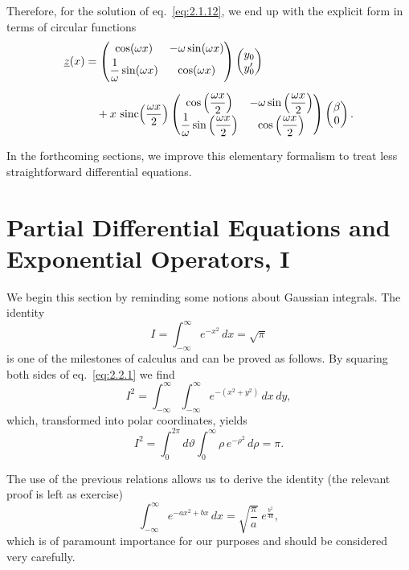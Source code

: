 Therefore, for the solution of eq.~\eqref{eq:2.1.12}, we end up with the explicit form in terms of circular functions
\begin{align}
\underline{z}(x)&=
\begin{pmatrix}\cos(\omega x)&-\omega\sin(\omega x)\\[1mm]
\dfrac{1}{\omega}\sin(\omega x)&\cos(\omega x)\end{pmatrix}
\begin{pmatrix}y_{0}\\y_{0}'\end{pmatrix}\notag\\[2mm]
&\quad+x\,\operatorname{sinc}\!\left(\frac{\omega x}{2}\right)
\begin{pmatrix}\cos\left(\dfrac{\omega x}{2}\right)&-\omega\sin\left(\dfrac{\omega x}{2}\right)\\[1mm]
\dfrac{1}{\omega}\sin\left(\dfrac{\omega x}{2}\right)&\cos\left(\dfrac{\omega x}{2}\right)\end{pmatrix}
\begin{pmatrix}\beta\\0\end{pmatrix}.
\label{eq:2.1.17}
\end{align}

In the forthcoming sections, we improve this elementary formalism to treat less straightforward differential equations.

\section{Partial Differential Equations and Exponential Operators, I}

We begin this section by reminding some notions about Gaussian integrals. The identity
\begin{equation}
I=\int_{-\infty}^{\infty}e^{-x^{2}}\,dx=\sqrt{\pi}
\label{eq:2.2.1}
\end{equation}
is one of the milestones of calculus and can be proved as follows. By squaring both sides of eq.~\eqref{eq:2.2.1} we find
\begin{equation}
I^{2}=\int_{-\infty}^{\infty}\int_{-\infty}^{\infty}
e^{-(x^{2}+y^{2})}\,dx\,dy,
\label{eq:2.2.2}
\end{equation}
which, transformed into polar coordinates, yields
\begin{equation}
I^{2}=\int_{0}^{2\pi}d\vartheta\int_{0}^{\infty}\rho\,e^{-\rho^{2}}\,d\rho=\pi.
\label{eq:2.2.3}
\end{equation}

The use of the previous relations allows us to derive the identity (the relevant proof is left as exercise)
\begin{equation}
\int_{-\infty}^{\infty}e^{-a x^{2}+b x}\,dx
=\sqrt{\frac{\pi}{a}}\;e^{\frac{b^{2}}{4a}},
\label{eq:2.2.4}
\end{equation}
which is of paramount importance for our purposes and should be considered very carefully.

